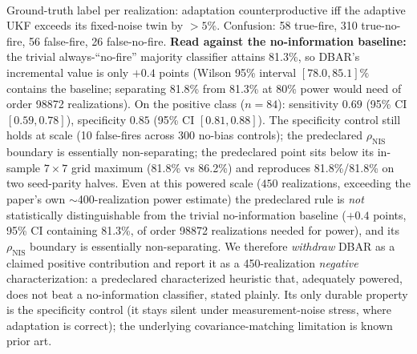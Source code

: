 \begin{table}[t]
  \centering
  \caption{Independent-realization characterization of the predeclared DBAR rule. 450 independently seeded realizations (14 trajectories each) span three families (nominal control, measurement-noise stress, and dynamics/force-model-bias drawn from a severity continuum). Ground truth per realization: adaptation is counterproductive iff the adaptive UKF exceeds its fixed-noise twin by more than the predeclared 5\% materiality margin. The rule and its round thresholds ($R_{\mathrm{eff}}>1.5$, $\rho_{\mathrm{NIS}}\geq1.5$) are fixed a priori.}
  \label{tab:dbar_independent_sweep}
  \\[2pt] {\footnotesize Ground-truth label per realization: adaptation counterproductive iff the adaptive UKF exceeds its fixed-noise twin by $>5\%$. Confusion: 58 true-fire, 310 true-no-fire, 56 false-fire, 26 false-no-fire. \textbf{Read against the no-information baseline:} the trivial always-``no-fire'' majority classifier attains 81.3\%, so DBAR's incremental value is only $+0.4$ points (Wilson 95\% interval $[78.0,85.1]\%$ contains the baseline; separating 81.8\% from 81.3\% at 80\% power would need of order 98872 realizations). On the positive class ($n=84$): sensitivity $0.69$ (95\% CI $[0.59,0.78]$), specificity $0.85$ (95\% CI $[0.81,0.88]$). The specificity control still holds at scale (10 false-fires across 300 no-bias controls); the predeclared $\rho_{\mathrm{NIS}}$ boundary is essentially non-separating; the predeclared point sits below its in-sample $7\times7$ grid maximum (81.8\% vs 86.2\%) and reproduces 81.8\%/81.8\% on two seed-parity halves. Even at this powered scale ($450$ realizations, exceeding the paper's own $\sim$400-realization power estimate) the predeclared rule is \emph{not} statistically distinguishable from the trivial no-information baseline ($+0.4$ points, 95\% CI containing 81.3\%, of order 98872 realizations needed for power), and its $\rho_{\mathrm{NIS}}$ boundary is essentially non-separating. We therefore \emph{withdraw} DBAR as a claimed positive contribution and report it as a 450-realization \emph{negative} characterization: a predeclared characterized heuristic that, adequately powered, does not beat a no-information classifier, stated plainly. Its only durable property is the specificity control (it stays silent under measurement-noise stress, where adaptation is correct); the underlying covariance-matching limitation is known prior art.}
\end{table}